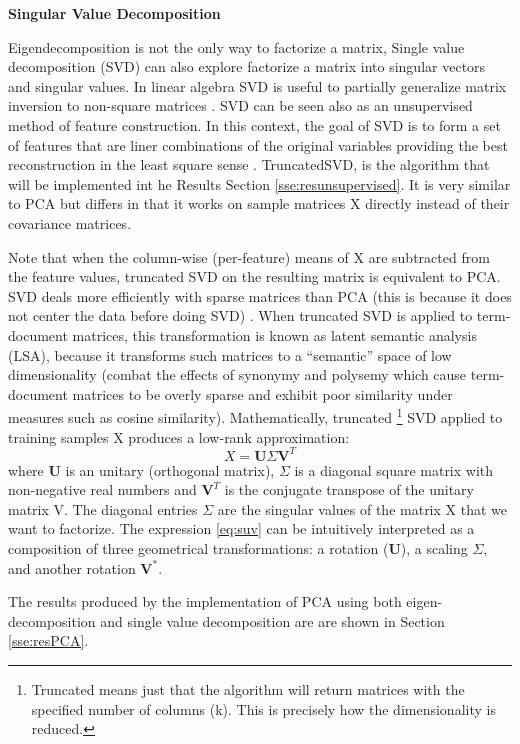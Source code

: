 \documentclass[11pt]{article}
\theoremstyle{definition}
\theoremstyle{remark}
\begin{document}
\textbf{Singular Value Decomposition}

Eigendecomposition is not the only way to factorize a matrix, Single value decomposition (SVD) can also explore factorize a matrix into singular vectors and singular values. In linear algebra SVD is useful to partially generalize matrix inversion to non-square matrices \cite{goodfellow2016deep}. SVD can be seen also as an unsupervised method of feature construction. In this context, the goal of SVD is to form a set of features that are liner combinations of the original variables providing the best reconstruction in the least square sense \cite{duda2012pattern}. TruncatedSVD, is the algorithm that will be implemented int he Results Section \ref{sse:resunsupervised}. It is very similar to PCA but differs in that it works on sample matrices X directly instead of their covariance matrices. 

Note that when the column-wise (per-feature) means of X are subtracted from the feature values, truncated SVD on the resulting matrix is equivalent to PCA. SVD deals more efficiently with sparse matrices than PCA (this is because it does not center the data before doing SVD) \cite{halko2009finding}. When truncated SVD is applied to term-document matrices, this transformation is known as latent semantic analysis (LSA), because it transforms such matrices to a “semantic” space of low dimensionality (combat the effects of synonymy and polysemy which cause term-document matrices to be overly sparse and exhibit poor similarity under measures such as cosine similarity).
Mathematically, truncated \footnote{Truncated means just that the algorithm will return matrices with the specified number of columns (k). This is precisely how the dimensionality is reduced.} SVD applied to training samples X produces a low-rank approximation:
\begin{equation}
X = \mathbf{U} \Sigma \mathbf{V}^{T}
\label{eq:suv}
\end{equation}
where $\mathbf{U}$ is an unitary (orthogonal matrix), $\Sigma$ is a diagonal square matrix with non-negative real numbers and $\mathbf{V} ^{T}$ is the conjugate transpose of the unitary matrix V. The diagonal entries $\Sigma$ are the singular values of the matrix X that we want to factorize. The expression \ref{eq:suv} can be intuitively interpreted as a composition of three geometrical transformations: a rotation ($\mathbf {U}$), a scaling $\Sigma$, and another rotation $\mathbf{V}^{*}$.

The results produced by the implementation of PCA using both eigen-decomposition and single value decomposition are are shown in Section \ref{sse:resPCA}.
\end{document}
